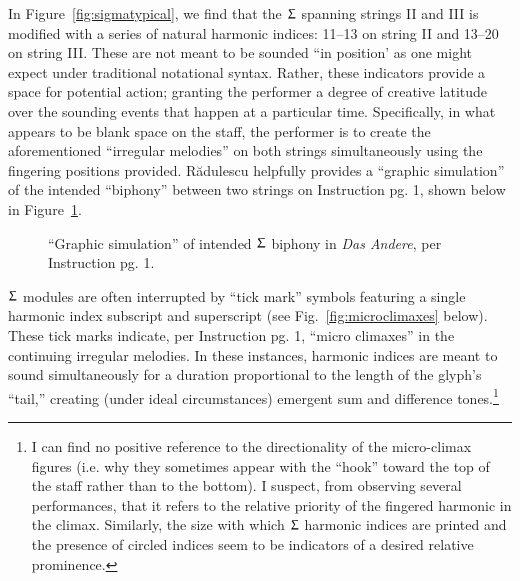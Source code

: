         \noindent In Figure~\ref{fig:sigmatypical}, we find that the $\Upsigma$ spanning strings II and III is modified with a series of natural harmonic indices: 11--13 on string II and 13--20 on string III. These are not meant to be sounded ``in position' as one might expect under traditional notational syntax. Rather, these indicators provide a space for potential action; granting the performer a degree of creative latitude over the sounding events that happen at a particular time. Specifically, in what appears to be blank space on the staff, the performer is to create the aforementioned ``irregular melodies'' on both strings simultaneously using the fingering positions provided. Rădulescu helpfully provides a ``graphic simulation'' of the intended ``biphony'' between two strings on Instruction pg. 1, shown below in Figure~\ref{fig:graphicsimulation}.

    
            \begin{figure} 
                \centering
                \captionsetup{width=.51\textwidth}
                \caption{``Graphic simulation'' of intended $\Upsigma$ biphony in \textit{Das Andere}, per Instruction pg. 1.}
                \label{fig:graphicsimulation}
            \end{figure}

    
        $\Upsigma$ modules are often interrupted by ``tick mark'' symbols featuring a single harmonic index subscript and superscript (see Fig.~\ref{fig:microclimaxes} below). These tick marks indicate, per Instruction pg. 1, ``micro climaxes'' in the continuing irregular melodies. In these instances, harmonic indices are meant to sound simultaneously for a duration proportional to the length of the glyph's ``tail,'' creating (under ideal circumstances) emergent sum and difference tones.\footnote{I can find no positive reference to the directionality of the micro-climax figures (i.e. why they sometimes appear with the ``hook'' toward the top of the staff rather than to the bottom). I suspect, from observing several performances, that it refers to the relative priority of the fingered harmonic in the climax. Similarly, the size with which $\Upsigma$ harmonic indices are printed and the presence of circled indices seem to be indicators of a desired relative prominence.}

